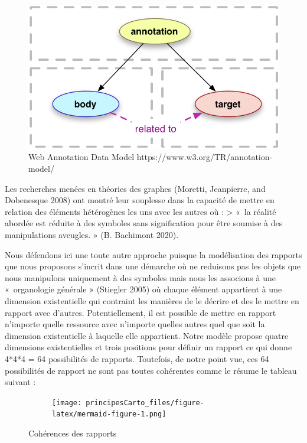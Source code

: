 \documentclass[
  letterpaper,
  DIV=11,
  numbers=noendperiod]{scrreprt}
\begin{document}
\begin{figure}

{\centering \includegraphics{media/10000001000002C2000001965EFA665F8AB6D163.png}

}

\caption{\label{fig-webAnnotation}Web Annotation Data Model
https://www.w3.org/TR/annotation-model/}

\end{figure}

Les recherches menées en théories des graphes (Moretti, Jeanpierre, and
Dobenesque 2008) ont montré leur souplesse dans la capacité de mettre en
relation des éléments hétérogènes les uns avec les autres où :
\textgreater{} «~la réalité abordée est réduite à des symboles sans
signification pour être soumise à des manipulations aveugles. » (B.
Bachimont 2020).

Nous défendons ici une toute autre approche puisque la modélisation des
rapports que nous proposons s'incrit dans une démarche où ne reduisons
pas les objets que nous manipulons uniquement à des symboles mais nous
les associons à une «~organologie générale » (Stiegler 2005) où chaque
élément appartient à une dimension existentielle qui contraint les
manières de le décrire et des le mettre en rapport avec d'autres.
Potentiellement, il est possible de mettre en rapport n'importe quelle
ressource avec n'importe quelles autres quel que soit la dimension
existentielle à laquelle elle appartient. Notre modèle propose quatre
dimensions existentielles et trois positions pour définir un rapport ce
qui donne 4*4*4 = 64 possibilités de rapports. Toutefois, de notre point
vue, ces 64 possibilités de rapport ne sont pas toutes cohérentes comme
le résume le tableau suivant :

\begin{figure}

{\centering 

\begin{figure}[H]

{\centering \texttt{[image: principesCarto\_files/figure-latex/mermaid-figure-1.png]}

}

\end{figure}

}

\caption{\label{fig-contraintesRapports}Cohérences des rapports}

\end{figure}
\end{document}
